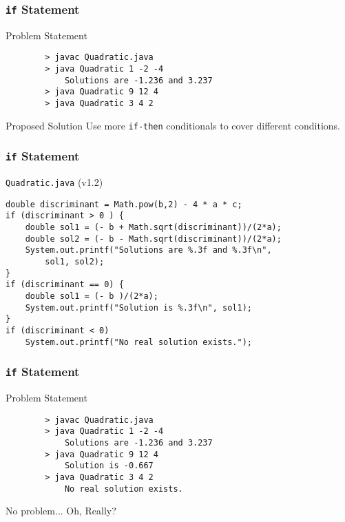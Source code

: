 \documentclass[10pt, compress]{beamer}
\begin{document}
\begin{frame}[fragile]
	\frametitle{\texttt{if} Statement}
	\begin{block}{Problem Statement}
		\begin{verbatim}
		> javac Quadratic.java
		> java Quadratic 1 -2 -4
			Solutions are -1.236 and 3.237
		> java Quadratic 9 12 4
		> java Quadratic 3 4 2
		\end{verbatim}
	\end{block}
	\begin{block}{Proposed Solution}
		Use more \texttt{if-then} conditionals to cover different conditions.
	\end{block}
\end{frame}

\begin{frame}[fragile]
	\frametitle{\texttt{if} Statement}
	\begin{block}{\texttt{Quadratic.java} (v1.2)}
		\begin{verbatim}
double discriminant = Math.pow(b,2) - 4 * a * c;
if (discriminant > 0 ) {
	double sol1 = (- b + Math.sqrt(discriminant))/(2*a);
	double sol2 = (- b - Math.sqrt(discriminant))/(2*a);
	System.out.printf("Solutions are %.3f and %.3f\n",
		sol1, sol2);
}
if (discriminant == 0) {
	double sol1 = (- b )/(2*a);
	System.out.printf("Solution is %.3f\n", sol1);
}
if (discriminant < 0)
	System.out.printf("No real solution exists.");
		\end{verbatim}
	\end{block}
\end{frame}

\begin{frame}[fragile]
	\frametitle{\texttt{if} Statement}
	\begin{block}{Problem Statement}
		\begin{verbatim}
		> javac Quadratic.java
		> java Quadratic 1 -2 -4
			Solutions are -1.236 and 3.237
		> java Quadratic 9 12 4
			Solution is -0.667
		> java Quadratic 3 4 2
			No real solution exists.
		\end{verbatim}
		No problem... Oh, Really?
	\end{block}
\end{frame}
\end{document}
